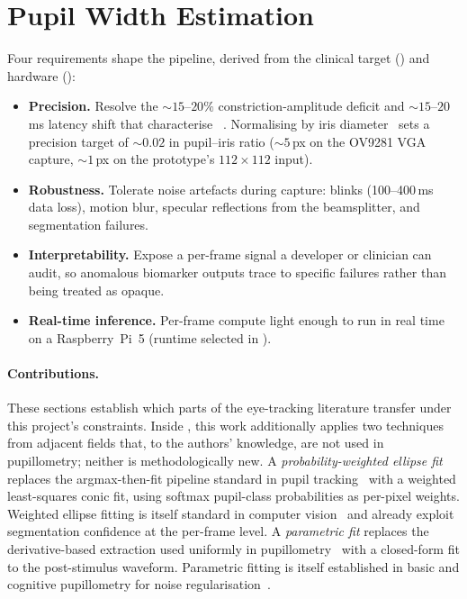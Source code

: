 \clearpage
\section{Pupil Width Estimation}
\label{sec:pupil-width}

Four requirements shape the pipeline, derived from the clinical target () and hardware ():

\begin{itemize}[noitemsep,topsep=2pt]
    \item \textbf{Precision.} Resolve the ${\sim}15$--$20\%$ constriction-amplitude deficit and ${\sim}15$--$20$\,ms latency shift that characterise ~\cite{master2020pupillary, ciuffreda2017plr}. Normalising by iris diameter~\cite{boyle2021hvid} sets a precision target of ${\sim}0.02$ in pupil--iris ratio (${\sim}5$\,px on the OV9281 VGA capture, ${\sim}1$\,px on the prototype's $112{\times}112$ input).
    \item \textbf{Robustness.} Tolerate noise artefacts during capture: blinks (100--400\,ms data loss), motion blur, specular reflections from the beamsplitter, and segmentation failures.
    \item \textbf{Interpretability.} Expose a per-frame signal a developer or clinician can audit, so anomalous biomarker outputs trace to specific failures rather than being treated as opaque.
    \item \textbf{Real-time inference.} Per-frame compute light enough to run in real time on a Raspberry~Pi~5 (runtime selected in ).
\end{itemize}

\paragraph{Contributions.} These sections establish which parts of the eye-tracking literature transfer under this project's constraints. Inside , this work additionally applies two techniques from adjacent fields that, to the authors' knowledge, are not used in  pupillometry; neither is methodologically new. A \emph{probability-weighted ellipse fit} replaces the argmax-then-fit pipeline standard in pupil tracking~\cite{yiu2019deepvog, chaudhary2019ritnet, kothari2021ellseg} with a weighted least-squares conic fit, using softmax pupil-class probabilities as per-pixel weights. Weighted ellipse fitting is itself standard in computer vision~\cite{kanatani2016ellipse} and \citet{yiu2019deepvog} already exploit segmentation confidence at the per-frame level. A \emph{parametric  fit} replaces the derivative-based extraction used uniformly in  pupillometry~\cite{bergamin2003pupil, mariakakis2017pupilscreen, master2020pupillary} with a closed-form fit to the post-stimulus waveform. Parametric  fitting is itself established in basic and cognitive pupillometry for noise regularisation~\cite{korn2016solid, mcanany2018iphone, pupilmetrics2024}.


